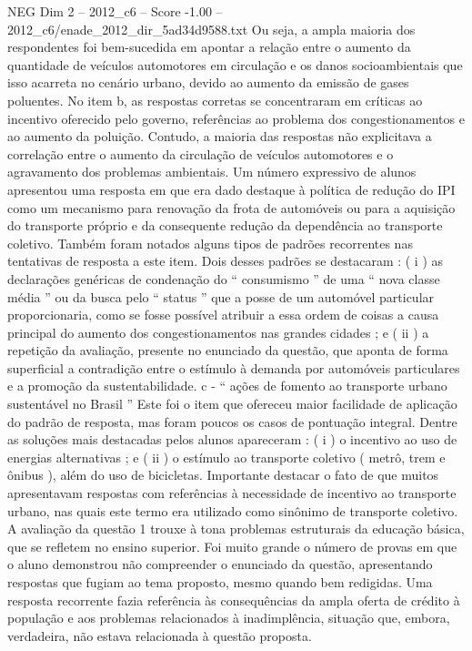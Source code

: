 \begin{textsample}{NEG Dim 2 – 2012\_c6 – Score -1.00 – 2012\_c6/enade\_2012\_dir\_5ad34d9588.txt}
Ou seja, a ampla maioria dos respondentes foi bem-sucedida em apontar a relação entre o aumento da quantidade de veículos automotores em circulação e os danos socioambientais que isso acarreta no cenário urbano, devido ao aumento da emissão de gases poluentes.
No item b, as respostas corretas se concentraram em críticas ao incentivo oferecido pelo governo, referências ao problema dos congestionamentos e ao aumento da poluição.
Contudo, a maioria das respostas não explicitava a correlação entre o aumento da circulação de veículos automotores e o agravamento dos problemas ambientais.
Um número expressivo de alunos apresentou uma resposta em que era dado destaque à política de redução do IPI como um mecanismo para renovação da frota de automóveis ou para a aquisição do transporte próprio e da consequente redução da dependência ao transporte coletivo.
Também foram notados alguns tipos de padrões recorrentes nas tentativas de resposta a este item.
Dois desses padrões se destacaram : ( i ) as declarações genéricas de condenação do “ consumismo ” de uma “ nova classe média ” ou da busca pelo “ status ” que a posse de um automóvel particular proporcionaria, como se fosse possível atribuir a essa ordem de coisas a causa principal do aumento dos congestionamentos nas grandes cidades ; e ( ii ) a repetição da avaliação, presente no enunciado da questão, que aponta de forma superficial a contradição entre o estímulo à demanda por automóveis particulares e a promoção da sustentabilidade. c - “ ações de fomento ao transporte urbano sustentável no Brasil ” Este foi o item que ofereceu maior facilidade de aplicação do padrão de resposta, mas foram poucos os casos de pontuação integral.
Dentre as soluções mais destacadas pelos alunos apareceram : ( i ) o incentivo ao uso de energias alternativas ; e ( ii ) o estímulo ao transporte coletivo ( metrô, trem e ônibus ), além do uso de bicicletas.
Importante destacar o fato de que muitos apresentavam respostas com referências à necessidade de incentivo ao transporte urbano, nas quais este termo era utilizado como sinônimo de transporte coletivo.
A avaliação da questão 1 trouxe à tona problemas estruturais da educação básica, que se refletem no ensino superior.
Foi muito grande o número de provas em que o aluno demonstrou não compreender o enunciado da questão, apresentando respostas que fugiam ao tema proposto, mesmo quando bem redigidas.
Uma resposta recorrente fazia referência às consequências da ampla oferta de crédito à população e aos problemas relacionados à inadimplência, situação que, embora, verdadeira, não estava relacionada à questão proposta.

\end{textsample}
